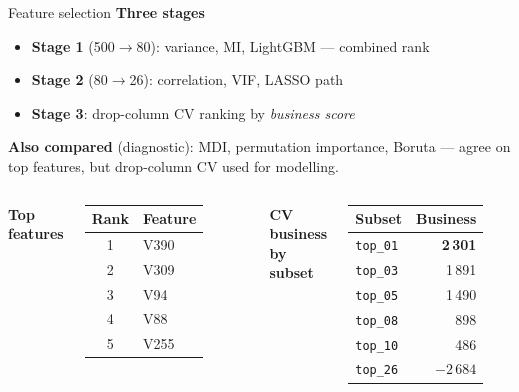 \documentclass[aspectratio=169]{beamer}
\begin{document}
\begin{frame}{Feature selection}
    \textbf{Three stages}
    \begin{itemize}
        \item \textbf{Stage 1} (500$\to$80): variance, MI, LightGBM --- combined rank
        \item \textbf{Stage 2} (80$\to$26): correlation, VIF, LASSO path
        \item \textbf{Stage 3}: drop-column CV ranking by \emph{business score}
    \end{itemize}

    \vspace{0.3em}
    \textbf{Also compared} (diagnostic): MDI, permutation importance, Boruta --- agree on top features, but drop-column CV used for modelling.

    \vspace{0.3em}
    \begin{columns}[T,onlytextwidth]
        \centering\footnotesize
        \textbf{Top features}
        \begin{tabular}{cl}
            \toprule
            Rank & Feature \\
            \midrule
            1 & V390 \\
            2 & V309 \\
            3 & V94 \\
            4 & V88 \\
            5 & V255 \\
            \bottomrule
        \end{tabular}
        \centering\footnotesize
        \textbf{CV business by subset}
        \begin{tabular}{lr}
            \toprule
            Subset & Business \\
            \midrule
            \texttt{top\_01} & \textbf{2\,301} \\
            \texttt{top\_03} & 1\,891 \\
            \texttt{top\_05} & 1\,490 \\
            \texttt{top\_08} & 898 \\
            \texttt{top\_10} & 486 \\
            \texttt{top\_26} & $-2\,684$ \\
            \bottomrule
        \end{tabular}
    \end{columns}
\end{frame}
\end{document}
